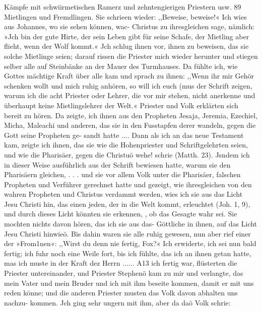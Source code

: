 Kämpfe mit schwiirmetischen Ramerz und zehntengierigen Priestern usw. 89
Mietlingen und Fremdlingen. Sie schrieen wieder: ,,Beweise,
beweise!« Ich wies aus Johannes, wo sie sehen können, wac-
Christus zu ihresgleichen sage, nämlich: »Jch bin der gute Hirte,
der sein Leben gibt für seine Schafe, der Mietling aber flieht,
wenn der Wolf kommt.« Jch schlug ihnen vor, ihnen zu beweisen,
das sie solche Mietlinge seien; darauf rissen die Priester mich
wieder herunter und stiegen selber alle auf Steinbänke
an der Mauer des Turmhauses. Da fühlte ich, wie Gottes
mächtige Kraft über alle kam und sprach zu ihnen: ,,Wenn ihr
mir Gehör schenken wollt und mich ruhig anhören, so will ich
euch (mus der Schrift zeigen, warum ich die acht Priester oder
Lehrer, die vor mir stehen, nicht anerkenne und überhaupt keine
Mietlingslehrer der Welt.« Priester und Volk erklärten sich bereit
zu hören. Da zeigte, ich ihnen aus den Propheten Jesaja,
Jeremia, Ezechiel, Micha, Maleachi und anderen, das sie in den
Fusstapfen derer wandeln, gegen die Gott seine Propheten ge-
sandt hatte ....
Dann als ich an das neue Testament kam, zeigte ich ihnen,
das sie wie die Hohenpriester und Schriftgelehrten seien, und
wie die Pharisäer, gegen die Christuö wehe! schrie (Matth. 23).
Jsndem ich in dieser Weise ausführlich aus der Schrift bewiesen
hatte, warum sie den Pharisäern gleichen, . . . und sie vor allem
Volk unter die Pharisäer, falschen Propheten und Verführer
gerechnet hatte und gezeigt, wie ihresgleichen von den wahren
Propheten und Christus verdammt werden, wies ich sie aus das
Licht Jesu Christi hin, das einen jeden, der in die Welt kommt,
erleuchtet (Joh. 1, 9), und durch dieses Licht könnten sie erkennen,
, ob das Gesagte wahr sei. Sie mochten nichts davon hören, das
ich sie aus das- Göttliche in ihnen, auf das Licht Jesu Christi
hinwieö. Bis dahin waren sie alle ruhig gewesen, nun aber
rief einer der »From1nen«: ,,Wirst du denn nie fertig, Fox?«
Ich erwiderte, ich sei nun bald fertig; ich fuhr noch eine Weile
fort, bis ich fühlte, das ich an ihnen getan hatte, mas ich muste
in der Kraft dez Herrn ...... A13 ich fertig war, flüsterten
die Priester untereinander, und Priester Stephenö kam zu mir
und verlangte, das mein Vater und mein Bruder und ich mit
ihm beseite kommen, damit er mit uns reden könne; und die
anderen Priester musten das Volk davon abhalten uns nachzu-
kommen. Jch ging sehr ungern mit ihm, aber da daö Volk schrie:


